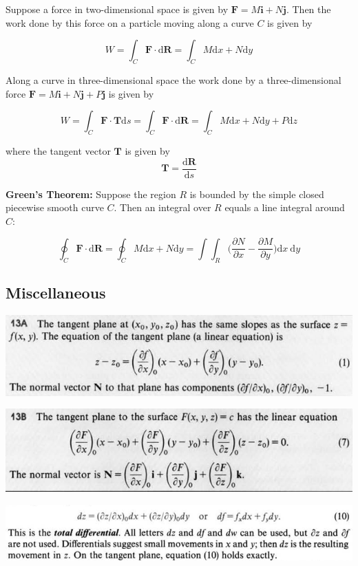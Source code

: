 \documentclass{article}
\begin{document}
Suppose a force in two-dimensional space is given by \(\boldsymbol{F} = M\boldsymbol{i} + N \boldsymbol{j}\). Then the work done by this force on a particle moving along a curve \(C\) is given by

\[
W = \int_C \boldsymbol{F} \cdot \text{d}\boldsymbol{R} = \int_C M \text{d}x + N \text{d} y
\]

Along a curve in three-dimensional space the work done by a three-dimensional force \(\boldsymbol{F} = M\boldsymbol{i} + N \boldsymbol{j} + P \boldsymbol{j}\) is given by

\[
W = \int_C \boldsymbol{F} \cdot \boldsymbol{T} \text{d}s = \int_C \boldsymbol{F} \cdot \text{d}\boldsymbol{R} = \int_C M \text{d}x + N \text{d}y + P \text{d}z
\]

where the tangent vector \(\boldsymbol{T}\) is given by \[\boldsymbol{T} = \frac{\text{d}\boldsymbol{R}}{\text{d}s}\]

\textbf{Green's Theorem:} Suppose the region \(R\) is bounded by the simple closed piecewise smooth curve \(C\). Then an integral over \(R\) equals a line integral around \(C\):

\[
\oint_C \boldsymbol{F} \cdot \text{d}\boldsymbol{R} = \oint_C M \text{d}x + N \text{d}y = \int \int_R \bigg( \frac{\partial N}{\partial x} - \frac{\partial M}{\partial y} \bigg) \text{d}x \ \text{d}y
\]

\subsection{Miscellaneous}

\includegraphics[scale=0.65]{tangent_plane}

\includegraphics[scale=0.65]{tangent_plane2}

\includegraphics[scale=0.55]{total_differential}
\end{document}
